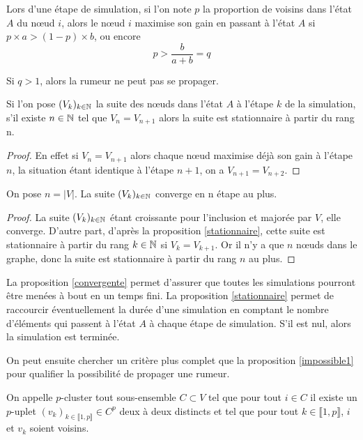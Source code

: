 \documentclass{article}
\begin{document}
Lors d'une étape de simulation, si l'on note $p$ la proportion de voisins dans l'état $A$ du nœud $i$, alors le nœud $i$ maximise son gain en passant à l'état $A$ si $p \times a > (1-p) \times b$, ou encore $$ p > \frac{b}{a+b} = q$$ 

\begin{prop}
  \label{impossible1}
  Si $q > 1$, alors la rumeur ne peut pas se propager.
\end{prop}

\begin{prop}
  \label{stationnaire}
  Si l'on pose $(V_k)_{k\in\mathbb{N}}$ la suite des nœuds dans l'état $A$ à l'étape $k$ de la simulation, s'il existe $n\in\mathbb{N}$ tel que $V_n = V_{n+1}$ alors la suite est stationnaire à partir du rang n.
\end{prop}
\begin{proof}
  En effet si $V_n = V_{n+1}$ alors chaque nœud maximise déjà son gain à l'étape $n$, la situation étant identique à l'étape $n+1$, on a $V_{n+1} = V_{n+2}$.
\end{proof}

\begin{prop}
  \label{convergente}
  On pose $n=|V|$. La suite $(V_k)_{k\in\mathbb{N}}$ converge en n étape au plus.
\end{prop}
\begin{proof}
  La suite $(V_k)_{k\in\mathbb{N}}$ étant croissante pour l'inclusion et majorée par $V$, elle converge. D'autre part, d'après la proposition \ref{stationnaire}, cette suite est stationnaire à partir du rang $k\in\mathbb{N}$ si $V_k = V_{k+1}$. Or il n'y a que $n$ nœuds dans le graphe, donc la suite est stationnaire à partir du rang $n$ au plus. 
\end{proof}

La proposition \ref{convergente} permet d'assurer que toutes les simulations pourront être menées à bout en un temps fini. La proposition \ref{stationnaire} permet de raccourcir éventuellement la durée d'une simulation en comptant le nombre d'éléments qui passent à l'état $A$ à chaque étape de simulation. S'il est nul, alors la simulation est terminée.

On peut ensuite chercher un critère plus complet que la proposition \ref{impossible1} pour qualifier la possibilité de propager une rumeur.
\begin{defi}
  On appelle $p$-cluster tout sous-ensemble $C \subset V$ tel que pour tout $i\in C$ il existe un $p$-uplet $(v_k)_{k\in \llbracket1,p\rrbracket} \in C^p$ deux à deux distincts et tel que pour tout $k\in \llbracket1,p\rrbracket$, $i$ et $v_k$ soient voisins.
\end{defi}
\end{document}
